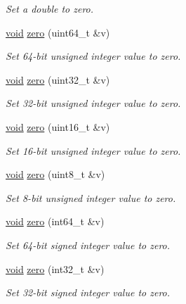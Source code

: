 \begin{DoxyCompactItemize}
\begin{DoxyCompactList}\small\item\em Set a double to zero. \end{DoxyCompactList}\item 
\hyperlink{tk_8h_aba408b7cd755a96426e004c015f5de8e}{void} \hyperlink{namespacedsp_ad6e8bc40c7492bab0993568bf6a7bd14}{zero} (uint64\+\_\+t \&v)
\begin{DoxyCompactList}\small\item\em Set 64-\/bit unsigned integer value to zero. \end{DoxyCompactList}\item 
\hyperlink{tk_8h_aba408b7cd755a96426e004c015f5de8e}{void} \hyperlink{namespacedsp_a9f9990a5a2bac29871bff5f6c11b1e59}{zero} (uint32\+\_\+t \&v)
\begin{DoxyCompactList}\small\item\em Set 32-\/bit unsigned integer value to zero. \end{DoxyCompactList}\item 
\hyperlink{tk_8h_aba408b7cd755a96426e004c015f5de8e}{void} \hyperlink{namespacedsp_a4a5c4476f87676c2e648162a07500e3d}{zero} (uint16\+\_\+t \&v)
\begin{DoxyCompactList}\small\item\em Set 16-\/bit unsigned integer value to zero. \end{DoxyCompactList}\item 
\hyperlink{tk_8h_aba408b7cd755a96426e004c015f5de8e}{void} \hyperlink{namespacedsp_a8098836a83f20758ef5919b21daf6c82}{zero} (uint8\+\_\+t \&v)
\begin{DoxyCompactList}\small\item\em Set 8-\/bit unsigned integer value to zero. \end{DoxyCompactList}\item 
\hyperlink{tk_8h_aba408b7cd755a96426e004c015f5de8e}{void} \hyperlink{namespacedsp_ae91e184a11c5b13e38f8d4b68450753a}{zero} (int64\+\_\+t \&v)
\begin{DoxyCompactList}\small\item\em Set 64-\/bit signed integer value to zero. \end{DoxyCompactList}\item 
\hyperlink{tk_8h_aba408b7cd755a96426e004c015f5de8e}{void} \hyperlink{namespacedsp_aedf4fcf41ff9169d33f6cdcc20aa3847}{zero} (int32\+\_\+t \&v)
\begin{DoxyCompactList}\small\item\em Set 32-\/bit signed integer value to zero. \end{DoxyCompactList}\item 

\end{DoxyCompactItemize}
